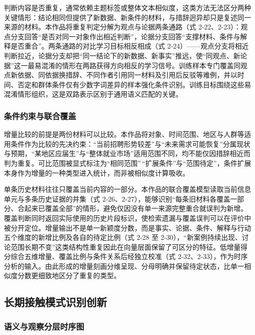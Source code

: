 判断内容是否重复，通常依赖主题标签或整体文本相似度，这类方法无法区分两种关键情形：结论相同但提供了新数据、新条件的材料，与措辞迥异却只是复述同一来源的材料。本作品将重复判定分解为观点与论据两条通路（式 2-22、2-23）：观点分支回答``是否对同一对象作出相近判断''，论据分支回答``支撑材料、条件与解释是否重合''。两条通路的对比学习目标相反相成（式 2-24）——观点分支将相近判断拉近，论据分支却把``同一结论下的新数据、新事实''推远，使``同观点、新论据''这一最易混淆的情形在两路获得方向相反的学习信号。训练样本专门覆盖同观点新依据、同依据换措辞、不同作者引用同一材料及引用后反驳等难例，并以时间、否定和群体条件仅有少数字词差异的样本强化条件识别。训练目标围绕这些易混淆情形组织，这是双路表示区别于通用语义匹配的关键。

\subsubsection{条件约束与联合覆盖}\label{section:4.3.2}

增量比较的前提是两份材料可以比较。本作品将对象、时间范围、地区与人群等适用条件作为比较的先决约束：``当前招聘形势较差''与``未来需求可能恢复''分属现状与预期，``某地区应届生''与``整体就业市场''适用范围不同，均不能仅因措辞相近而判为重复。可比范围被显式标注为``相同范围''\,``扩展条件''与``范围待定''，条件扩展本身作为增量的一种类型进入统计，而非被相似度计算吸收。

单条历史材料往往只覆盖当前内容的一部分。本作品的联合覆盖模型读取当前信息单元与多条历史证据的并集（式 2-26、2-27），能够识别``每条旧材料各覆盖一部分、合起来已覆盖全部''的情形，避免仅因没有单一来源完整重合就误判为新增。覆盖判断同时返回实际使用的历史片段标识，使检索遗漏与覆盖误判可以在评价中被分开定位。增量输出不是单一新颖度分数，而是事实、论据、条件、解释与行动五个维度的新增比例及各自的待定比例（式 2-28 至 2-30），``新案例持续出现、讨论范围长期不变''这类结构性重复因此在向量层面保留了可区分的特征。低增量得分综合五维增量、覆盖比例与条件关系后经独立校准（式 2-32、2-33），作为时序分析的输入。由此形成的增量刻画分维呈现、分母明确并保留待定状态，比单一相似度分数更细致地区分了重复的类型。

\subsection{长期接触模式识别创新}\label{section:4.4}

\subsubsection{语义与观察分层时序图}\label{section:4.4.1}


